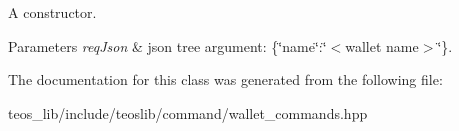 A constructor. 


\begin{DoxyParams}{Parameters}
{\em req\+Json} & json tree argument\+: \{\char`\"{}name\char`\"{}\+:\char`\"{}$<$wallet name$>$\char`\"{}\}. \\
\hline
\end{DoxyParams}


The documentation for this class was generated from the following file\+:\begin{DoxyCompactItemize}
\item 
teos\+\_\+lib/include/teoslib/command/wallet\+\_\+commands.\+hpp\end{DoxyCompactItemize}
